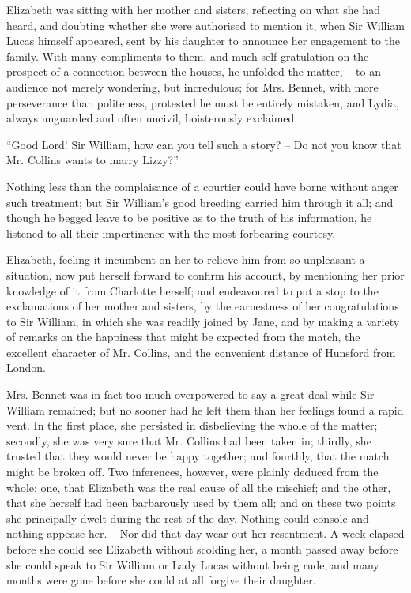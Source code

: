 
Elizabeth was sitting with her mother and sisters,
reflecting on what she had heard, and doubting whether
she were authorised to mention it, when Sir William Lucas
himself appeared, sent by his daughter to announce her
engagement to the family. With many compliments to
them, and much self-gratulation on the prospect of a
connection between the houses, he unfolded the matter, -- to
an audience not merely wondering, but incredulous;
for Mrs. Bennet, with more perseverance than politeness,
protested he must be entirely mistaken, and Lydia, always
unguarded and often uncivil, boisterously exclaimed,

“Good Lord! Sir William, how can you tell such
a story? -- Do not you know that Mr. Collins wants to
marry Lizzy?”

Nothing less than the complaisance of a courtier could
have borne without anger such treatment; but Sir
William’s good breeding carried him through it all; and
though he begged leave to be positive as to the truth
of his information, he listened to all their impertinence
with the most forbearing courtesy.

Elizabeth, feeling it incumbent on her to relieve him
from so unpleasant a situation, now put herself forward
to confirm his account, by mentioning her prior knowledge
of it from Charlotte herself; and endeavoured to put
a stop to the exclamations of her mother and sisters, by
the earnestness of her congratulations to Sir William,
in which she was readily joined by Jane, and by making
a variety of remarks on the happiness that might be
expected from the match, the excellent character of
Mr. Collins, and the convenient distance of Hunsford from
London.

Mrs. Bennet was in fact too much overpowered to
say a great deal while Sir William remained; but no
sooner had he left them than her feelings found a rapid
vent. In the first place, she persisted in disbelieving the
whole of the matter; secondly, she was very sure that
Mr. Collins had been taken in; thirdly, she trusted that
they would never be happy together; and fourthly, that
the match might be broken off. Two inferences, however,
were plainly deduced from the whole; one, that Elizabeth
was the real cause of all the mischief; and the other, that
she herself had been barbarously used by them all; and
on these two points she principally dwelt during the rest
of the day. Nothing could console and nothing appease
her. -- Nor did that day wear out her resentment. A week
elapsed before she could see Elizabeth without scolding
her, a month passed away before she could speak to
Sir William or Lady Lucas without being rude, and many
months were gone before she could at all forgive their
daughter.

